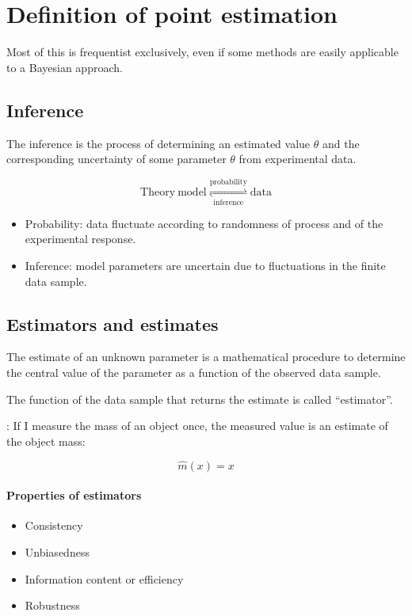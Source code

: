 

\section{Definition of point estimation}
\label{sec:def_of_point_estimation}

Most of this is frequentist exclusively, even if some methods are easily applicable to a Bayesian approach.

\subsection{Inference}
\label{subsec:point_estimation_inference}

The inference is the process of determining an estimated value $\hat{\theta}$ and the corresponding uncertainty of some parameter $\theta$ from experimental data.

$$
	\mathrm{Theory \ model} 
	\overset{\mathrm{probability}}
	{
		\underset{\mathrm{inference}}
		{\rightleftharpoons}
	} 
	  \mathrm{data}
$$

\begin{itemize}
	\item Probability: data fluctuate according to randomness of process and of the experimental response.
	\item Inference: model parameters are uncertain due to fluctuations in the finite data sample.
\end{itemize}

\subsection{Estimators and estimates}
\label{subsec:point_estimator_and_estimate}

The estimate of an unknown parameter is a mathematical procedure to determine the central value of the parameter as a function of the observed data sample.

The function of the data sample that returns the estimate is called “estimator”.

: If I measure the mass of an object once, the measured value is an estimate of the object mass:

$$
\hat{m}(x) = x
$$

\paragraph{Properties of estimators}

\begin{itemize}[$\to$]
	\item Consistency
	\item Unbiasedness
	\item Information content or efficiency
	\item Robustness
\end{itemize}